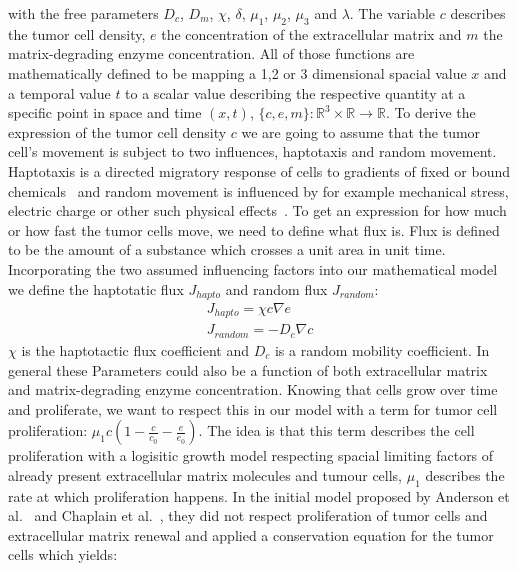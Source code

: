 with the free parameters $D_c$, $D_m$, $\chi$, $\delta$, $\mu_1$, $\mu_2$, $\mu_3$ and $\lambda$. \newline
The variable $c$ describes the tumor cell density, $e$ the concentration of the extracellular matrix and $m$ the matrix-degrading enzyme concentration. All of those functions are mathematically defined to be mapping a 1,2 or 3 dimensional spacial value $x$ and a temporal value $t$ to a scalar value describing the respective quantity at a specific point in space and time $(x,t)$, $\{c,e,m\} : \mathbb{R}^{3} \times \mathbb{R} \rightarrow \mathbb{R}$.\newline
To derive the expression of the tumor cell density $c$ we are going to assume that the tumor cell's movement is subject to two influences, haptotaxis and random movement. Haptotaxis is a directed migratory response of cells to gradients of fixed or bound chemicals~\cite{anderson_continuous_1998} and random movement is influenced by for example mechanical stress, electric charge or other such physical effects~\cite{Merino-Casallo2022-di}. To get an expression for how much or how fast the tumor cells move, we need to define what flux is. Flux is defined to be the amount of a substance  which crosses a unit area in unit time. Incorporating the two assumed influencing factors into our mathematical model we define the haptotatic flux $J_{hapto}$ and random flux $J_{random}$:
\begin{align*}
    J_{hapto} = \chi c \nabla e \\
    J_{random} = -D_c \nabla c
\end{align*}
$\chi$ is the haptotactic flux coefficient and $D_c$ is a random mobility coefficient. In general these Parameters could also be a function of both extracellular matrix and matrix-degrading enzyme concentration. Knowing that cells grow over time and proliferate, we want to respect this in our model with a term for tumor cell proliferation: $\mu_1 c (1-\frac{c}{c_0} - \frac{e}{e_0})$.\newline  
The idea is that this term describes the cell proliferation with a logisitic growth model respecting spacial limiting factors of already present extracellular matrix molecules and tumour cells, $\mu_1$ describes the rate at which proliferation happens. In the initial model proposed by Anderson et al.~\cite{anderson_continuous_1998, anderson_mathematical_2000} and Chaplain et al.~\cite{anderson_continuous_1998,chaplain_mathematical_2006,chaplain_mathematical_2006-1,franssen_mathematical_2019}, they did not respect proliferation of tumor cells and extracellular matrix renewal and applied a conservation equation for the tumor cells which yields:
